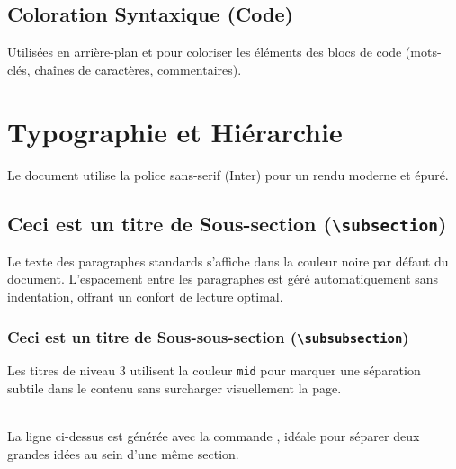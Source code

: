 \vspace{10pt}

\subsection{Coloration Syntaxique (Code)}
Utilisées en arrière-plan et pour coloriser les éléments des blocs de code (mots-clés, chaînes de caractères, commentaires).

\vspace{10pt}


\section{Typographie et Hiérarchie}

Le document utilise la police sans-serif (Inter) pour un rendu moderne et épuré.

\subsection{Ceci est un titre de Sous-section (\texttt{\textbackslash subsection})}
Le texte des paragraphes standards s'affiche dans la couleur noire par défaut du document. L'espacement entre les paragraphes est géré automatiquement sans indentation, offrant un confort de lecture optimal.

\subsubsection{Ceci est un titre de Sous-sous-section (\texttt{\textbackslash subsubsection})}
Les titres de niveau 3 utilisent la couleur \texttt{mid} pour marquer une séparation subtile dans le contenu sans surcharger visuellement la page. 

\vspace{10pt}
\hrulefull
\\La ligne ci-dessus est générée avec la commande , idéale pour séparer deux grandes idées au sein d'une même section.


